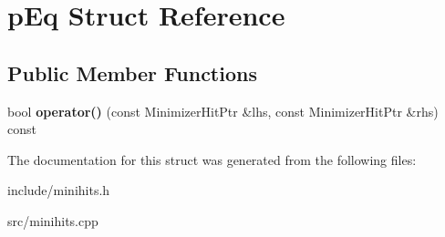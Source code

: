 \hypertarget{structpEq}{}\section{p\+Eq Struct Reference}
\label{structpEq}
\subsection*{Public Member Functions}
\begin{DoxyCompactItemize}
\item 
\mbox{\label{structpEq_a3414473a7c7825f9d71d02a5dbb899c7}} 
bool {\bfseries operator()} (const Minimizer\+Hit\+Ptr \&lhs, const Minimizer\+Hit\+Ptr \&rhs) const
\end{DoxyCompactItemize}


The documentation for this struct was generated from the following files\+:\begin{DoxyCompactItemize}
\item 
include/minihits.\+h\item 
src/minihits.\+cpp\end{DoxyCompactItemize}
